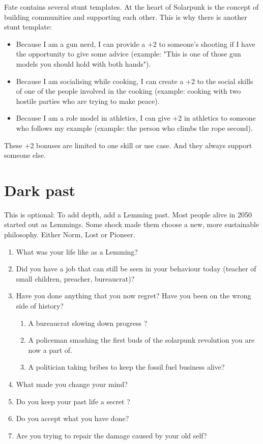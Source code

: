 Fate contains several stunt templates. At the heart of Solarpunk is the concept of building communities and supporting each other. This is why there is another stunt template:

\begin{itemize}
    \item Because I am a gun nerd, I can provide a +2 to someone's shooting if I have the opportunity to give some advice (example: "This is one of those gun models you should hold with both hands").
    \item Because I am socialising while cooking, I can create a +2 to the social skills of one of the people involved in the cooking (example: cooking with two hostile parties who are trying to make peace).
    \item Because I am a role model in athletics, I can give +2 in athletics to someone who follows my example (example: the person who climbs the rope second).
\end{itemize}

These +2 bonuses are limited to one skill or use case. And they always support someone else.


\section{Dark past}

This is optional: To add depth, add a Lemming past. Most people alive in 2050 started out as Lemmings. Some shock made them choose a new, more sustainable philosophy. Either Norm, Lost or Pioneer.

\begin{enumerate}
    \item What was your life like as a Lemming?
    \item Did you have a job that can still be seen in your behaviour today (teacher of small children, preacher, bureaucrat)?
    \item Have you done anything that you now regret? Have you been on the wrong side of history?
    \begin{enumerate}
        \item A bureaucrat slowing down progress ?
        \item A policeman smashing the first buds of the solarpunk revolution you are now a part of.
        \item A politician taking bribes to keep the fossil fuel business alive?
    \end{enumerate}
    \item What made you change your mind?
    \item Do you keep your past life a secret ?
    \item Do you accept what you have done?
    \item Are you trying to repair the damage caused by your old self?
\end{enumerate}

